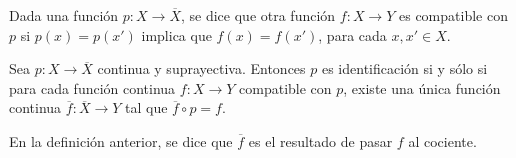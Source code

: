 

\begin{definition}
Dada una función $p : X \longrightarrow \overline{X}$, se dice que otra función $f : X \longrightarrow Y$ es compatible con $p$ si $p(x) = p(x')$ implica que $f(x) = f(x')$, para cada $x, x' \in X$.
\end{definition}

\begin{theorem}
Sea $p : X \longrightarrow \overline{X}$ continua y suprayectiva. Entonces $p$ es identificación si y sólo si para cada función continua $f : X \longrightarrow Y$ compatible con $p$, existe una única función continua $\overline{f} : \overline{X} \longrightarrow Y$ tal que $\overline{f} \circ p = f$.
\bigskip

\end{theorem}

\begin{definition}
En la definición anterior, se dice que $\overline{f}$ es el resultado de pasar $f$ al cociente.
\end{definition}
